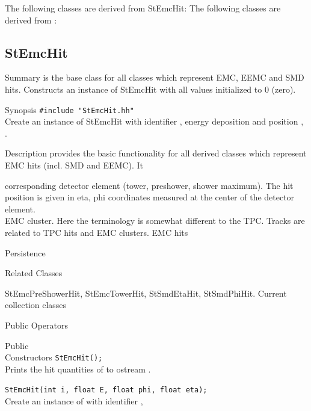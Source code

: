     The following classes are derived from StEmcHit: 
%
    The following classes are derived from : 
\subsection{StEmcHit}
\label{sec:StEmcHit}
\begin{Entry}
\item[Summary]
     is the base class for all classes which represent EMC, EEMC and SMD hits.
    Constructs an instance of StEmcHit with all values initialized to 0 (zero).
\item[Synopsis]
    \verb+#include "StEmcHit.hh"+\\
    Create an instance of StEmcHit with identifier ,
    energy deposition  and position , .
\item[Description]
     provides the basic functionality for all
    derived classes which represent EMC hits (incl. SMD and EEMC). It
    
    corresponding detector element (tower, preshower, shower maximum).
    The hit position is given in eta, phi coordinates measured at the
    center of the detector element.\\
    
    EMC cluster. Here the terminology is somewhat different to the
    TPC. Tracks are related to TPC hits and EMC clusters.  EMC hits
    

\item[Persistence]
    

\item[Related Classes]
    
    StEmcPreShowerHit, StEmcTowerHit, StSmdEtaHit, StSmdPhiHit.
    Current collection classes
    
\item[Public Operators]
    
    
\item[Public\\ Constructors]
    \verb+StEmcHit();+ \\
    Prints the hit quantities of  to ostream .

    \verb+StEmcHit(int i, float E, float phi, float eta);+ \\
    Create an instance of  with identifier ,
   


\end{Entry}
